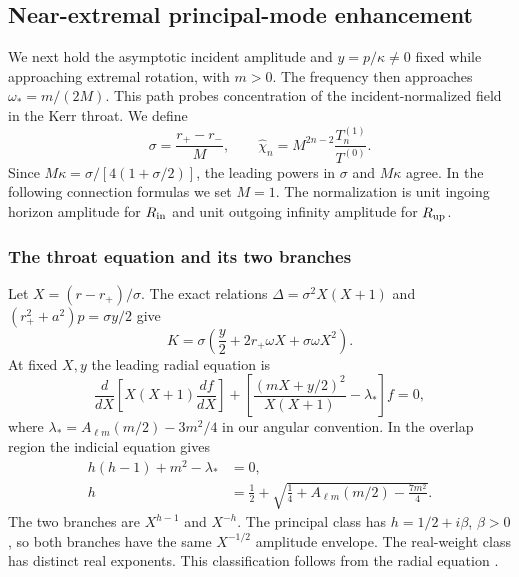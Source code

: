 \subsection{Near-extremal principal-mode enhancement}
\label{sec:principal20261014}

We next hold the asymptotic incident amplitude and
$y=p/\kappa\ne0$ fixed while approaching extremal rotation, with $m>0$.
The frequency then approaches $\omega_*=m/(2M)$.
This path probes concentration of the incident-normalized field in the Kerr
throat.  We define
\begin{equation}
\sigma=\frac{r_+-r_-}{M},\qquad
\widehat\chi_n=M^{2n-2}\frac{T_n^{(1)}}{T^{(0)}}.
\label{eq:principal-parameters}
\end{equation}
Since $M\kappa=\sigma/[4(1+\sigma/2)]$, the leading powers in $\sigma$
and $M\kappa$ agree.  In the following connection formulas we set $M=1$.
The normalization is unit ingoing horizon amplitude for $R_{\rm in}$ and
unit outgoing infinity amplitude for $R_{\rm up}$.

\subsubsection{The throat equation and its two branches}

Let $X=(r-r_+)/\sigma$.  The exact relations
$\Delta=\sigma^2X(X+1)$ and $(r_+^2+a^2)p=\sigma y/2$ give
\begin{equation}
K=\sigma\left(\frac y2+2r_+\omega X+\sigma\omega X^2\right).
\end{equation}
At fixed $X,y$ the leading radial equation is
\begin{equation}
\frac{d}{dX}\left[X(X+1)\frac{df}{dX}\right]
+\left[\frac{(mX+y/2)^2}{X(X+1)}-\lambda_*\right]f=0,
\label{eq:principal-near-ode}
\end{equation}
where $\lambda_*=A_{\ell m}(m/2)-3m^2/4$ in our angular convention.
In the overlap region the indicial equation gives
\begin{align}
h(h-1)+m^2-\lambda_*&=0,\nonumber\\
h&=\frac12+\sqrt{\frac14+A_{\ell m}(m/2)-\frac{7m^2}{4}}.
\label{eq:principal-weight}
\end{align}
The two branches are $X^{h-1}$ and $X^{-h}$.
The principal class has $h=1/2+i\beta$, $\beta>0$, so both branches have
the same $X^{-1/2}$ amplitude envelope.  The real-weight class has distinct
real exponents.  This classification follows from the radial equation
\cite{BredbergKerrCFT2010}.

